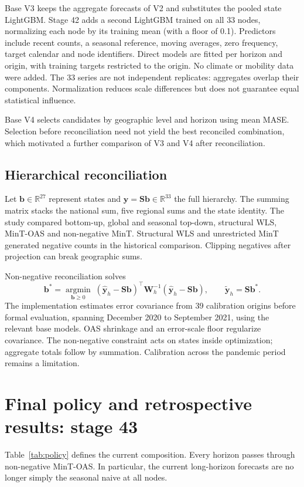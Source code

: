 \documentclass[12pt,a4paper]{article}
\begin{document}
Base V3 keeps the aggregate forecasts of V2 and substitutes the pooled state LightGBM. Stage 42 adds a second LightGBM trained on all 33 nodes, normalizing each node by its training mean (with a floor of 0.1). Predictors include recent counts, a seasonal reference, moving averages, zero frequency, target calendar and node identifiers. Direct models are fitted per horizon and origin, with training targets restricted to the origin. No climate or mobility data were added. The 33 series are not independent replicates: aggregates overlap their components. Normalization reduces scale differences but does not guarantee equal statistical influence.

Base V4 selects candidates by geographic level and horizon using mean MASE. Selection before reconciliation need not yield the best reconciled combination, which motivated a further comparison of V3 and V4 after reconciliation.

\subsection{Hierarchical reconciliation}
Let $\mathbf b\in\mathbb R^{27}$ represent states and $\mathbf y=\mathbf S\mathbf b\in\mathbb R^{33}$ the full hierarchy. The summing matrix stacks the national sum, five regional sums and the state identity. The study compared bottom-up, global and seasonal top-down, structural WLS, MinT-OAS and non-negative MinT. Structural WLS and unrestricted MinT generated negative counts in the historical comparison. Clipping negatives after projection can break geographic sums.

Non-negative reconciliation solves
\begin{equation}
\mathbf b^*=\underset{\mathbf b\geq0}{\operatorname{argmin}}\;
(\hat{\mathbf y}_h-\mathbf S\mathbf b)^\top\mathbf W_h^{-1}(\hat{\mathbf y}_h-\mathbf S\mathbf b),
\qquad \tilde{\mathbf y}_h=\mathbf S\mathbf b^*.
\end{equation}
The implementation estimates error covariance from 39 calibration origins before formal evaluation, spanning December 2020 to September 2021, using the relevant base models. OAS shrinkage and an error-scale floor regularize covariance. The non-negative constraint acts on states inside optimization; aggregate totals follow by summation. Calibration across the pandemic period remains a limitation.

\section{Final policy and retrospective results: stage 43}
Table~\ref{tab:policy} defines the current composition. Every horizon passes through non-negative MinT-OAS. In particular, the current long-horizon forecasts are no longer simply the seasonal naive at all nodes.
\end{document}
